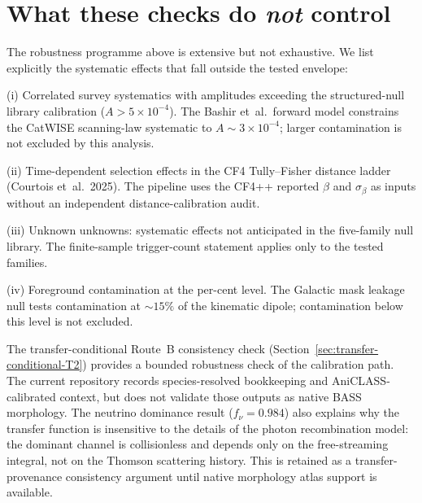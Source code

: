 \section{What these checks do \emph{not} control}
\label{sec:not-controlled}

The robustness programme above is extensive but not exhaustive.
We list explicitly the systematic effects that fall outside the
tested envelope:

(i) Correlated survey systematics with amplitudes exceeding the
structured-null library calibration ($A > 5 \times 10^{-4}$).
The Bashir et~al.\ forward model constrains the CatWISE
scanning-law systematic to $A \sim 3 \times 10^{-4}$; larger
contamination is not excluded by this analysis.

(ii) Time-dependent selection effects in the CF4 Tully--Fisher
distance ladder (Courtois et~al.\ 2025).  The pipeline uses the
CF4++ reported $\beta$ and $\sigma_\beta$ as inputs without
an independent distance-calibration audit.

(iii) Unknown unknowns: systematic effects not anticipated in
the five-family null library.  The finite-sample trigger-count
statement applies only to the tested families.

(iv) Foreground contamination at the per-cent level.  The
Galactic mask leakage null tests contamination at
$\sim 15\%$ of the kinematic dipole; contamination below this
level is not excluded.



The transfer-conditional Route~B consistency check
(Section~\ref{sec:transfer-conditional-T2}) provides a bounded
robustness check of the calibration path.  The current repository
records species-resolved bookkeeping and AniCLASS-calibrated context, but
does not validate those outputs as native BASS morphology.  The neutrino
dominance result ($f_\nu = 0.984$) also explains why the transfer
function is insensitive to the details of the photon
recombination model: the dominant channel is collisionless and
depends only on the free-streaming integral, not on the Thomson
scattering history.  This is retained as a transfer-provenance
consistency argument until native morphology atlas support is available.

